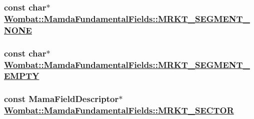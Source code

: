 \hypertarget{classWombat_1_1MamdaFundamentalFields_90bc743b579dfe8d866bc4601c9b3830}{
\subsubsection[MRKT\_\-SEGMENT\_\-NONE]{\setlength{\rightskip}{0pt plus 5cm}const char$\ast$ \hyperlink{classWombat_1_1MamdaFundamentalFields_90bc743b579dfe8d866bc4601c9b3830}{Wombat::Mamda\-Fundamental\-Fields::MRKT\_\-SEGMENT\_\-NONE}}}
\label{classWombat_1_1MamdaFundamentalFields_90bc743b579dfe8d866bc4601c9b3830}


\hypertarget{classWombat_1_1MamdaFundamentalFields_effa0e9358965deb3ab40070896ccf65}{
\subsubsection[MRKT\_\-SEGMENT\_\-EMPTY]{\setlength{\rightskip}{0pt plus 5cm}const char$\ast$ \hyperlink{classWombat_1_1MamdaFundamentalFields_effa0e9358965deb3ab40070896ccf65}{Wombat::Mamda\-Fundamental\-Fields::MRKT\_\-SEGMENT\_\-EMPTY}}}
\label{classWombat_1_1MamdaFundamentalFields_effa0e9358965deb3ab40070896ccf65}


\hypertarget{classWombat_1_1MamdaFundamentalFields_6e28bc03e238b7dbeacefccafa4fad37}{
\subsubsection[MRKT\_\-SECTOR]{\setlength{\rightskip}{0pt plus 5cm}const Mama\-Field\-Descriptor$\ast$ \hyperlink{classWombat_1_1MamdaFundamentalFields_6e28bc03e238b7dbeacefccafa4fad37}{Wombat::Mamda\-Fundamental\-Fields::MRKT\_\-SECTOR}}}
\label{classWombat_1_1MamdaFundamentalFields_6e28bc03e238b7dbeacefccafa4fad37}


